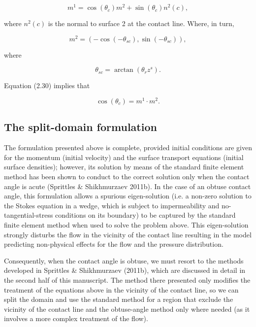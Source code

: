 \documentclass{article}
\begin{document}
\begin{equation}
m^{1} = \cos (\theta_{c})m^{2} + \sin (\theta_{c})n^{2}(c), \tag{2.30}
\end{equation}

where \(n^{2}(c)\) is the normal to surface 2 at the contact line. Where, in turn,

\begin{equation}
m^{2} = (-\cos (-\theta_{s c}),\sin (-\theta_{s c})), \tag{2.31}
\end{equation}

where

\begin{equation}
\theta_{sc} = \arctan (\theta_{r}z^{s}). \tag{2.32}
\end{equation}

Equation (2.30) implies that

\begin{equation}
\cos (\theta_{c}) = m^{1}\cdot m^{2}. \tag{2.33}
\end{equation}

\subsection{The split-domain formulation}

The formulation presented above is complete, provided initial conditions are given for the momentum (initial velocity) and the surface transport equations (initial surface densities); however, its solution by means of the standard finite element method has been shown to conduct to the correct solution only when the contact angle is acute (Sprittles \& Shikhmurzaev 2011b). In the case of an obtuse contact angle, this formulation allows a spurious eigen-solution (i.e. a non-zero solution to the Stokes equation in a wedge, which is subject to impermeability and no-tangential-stress conditions on its boundary) to be captured by the standard finite element method when used to solve the problem above. This eigen-solution strongly disturbs the flow in the vicinity of the contact line resulting in the model predicting non-physical effects for the flow and the pressure distribution.

Consequently, when the contact angle is obtuse, we must resort to the methods developed in Sprittles \& Shikhmurzaev (2011b), which are discussed in detail in the second half of this manuscript. The method there presented only modifies the treatment of the equations above in the vicinity of the contact line, so we can split the domain and use the standard method for a region that exclude the vicinity of the contact line and the obtuse-angle method only where needed (as it involves a more complex treatment of the flow).
\end{document}
